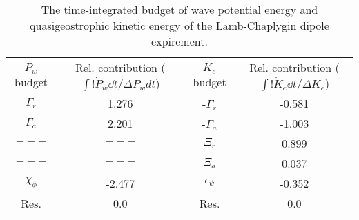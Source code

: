 \begin{table}
\begin{center}
\caption{The time-integrated budget of wave potential energy and quasigeostrophic                kinetic energy of the Lamb-Chaplygin dipole expirement. \label{table1}}
\begin{tabular}{cccc}
$\dot{P}_w$ budget & Rel. contribution ($\int!\dot{P}_w \dd t/\Delta P_w dt$) & $\dot{K}_e$ budget & Rel. contribution ($\int!\dot{K}_e \dd t/\Delta K_e$) \\
$\Gamma_r$ & 1.276 & -$\Gamma_r$ & -0.581 \\
$\Gamma_a$ & 2.201 & -$\Gamma_a$ & -1.003 \\
$---$ & $---$ & $\Xi_r$ & 0.899 \\
$---$ & $---$ & $\Xi_a$ & 0.037 \\
$\chi_\phi$ & -2.477 & $\epsilon_\psi$ & -0.352 \\
Res. & 0.0 & Res. & 0.0 \\
\end{tabular}
\end{center}
\end{table}
